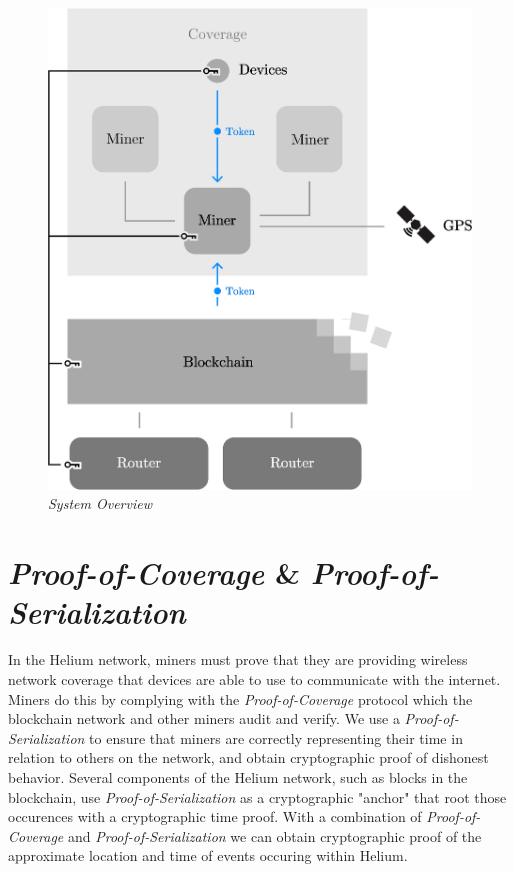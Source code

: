 \documentclass[letterpaper,11pt]{article}
\def\proofofcoverage/{\textit{Proof-of-Coverage}}
\begin{document}
\begin{figure}[H]
	\begin{center}
  		\includegraphics[width=\textwidth]{diagram1.eps}
  		\caption{\textit{System Overview}}
  		\label{fig:system}
 	\end{center}
\end{figure}

\newpage

\section{\proofofcoverage/ \& \textit{Proof-of-Serialization}} \label{poc}

In the Helium network, miners must prove that they are providing wireless network coverage that devices are able to use to communicate with the internet. Miners do this by complying with the \textit{Proof-of-Coverage} protocol which the blockchain network and other miners audit and verify. We use a \textit{Proof-of-Serialization} to ensure that miners are correctly representing their time in relation to others on the network, and obtain cryptographic proof of dishonest behavior. Several components of the Helium network, such as blocks in the blockchain, use \textit{Proof-of-Serialization} as a cryptographic "anchor" that root those occurences  with a cryptographic time proof. With a combination of \proofofcoverage/ and \textit{Proof-of-Serialization} we can obtain cryptographic proof of the approximate location and time of events occuring within Helium. \newline
\end{document}
